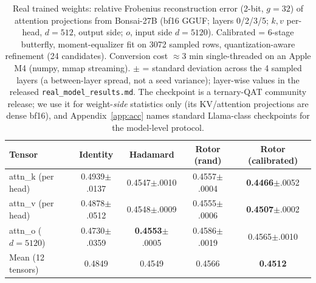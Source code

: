 \documentclass{article}
\begin{document}
\begin{table}[t]
\centering\small
\caption{Real trained weights: relative Frobenius reconstruction error
(2-bit, $g=32$) of attention projections from Bonsai-27B (bf16 GGUF; layers
0/2/3/5; $k,v$ per-head, $d{=}512$, output side; $o$, input side $d{=}5120$).
Calibrated = 6-stage butterfly, moment-equalizer fit on 3072 sampled rows,
quantization-aware refinement (24 candidates). Conversion cost $\approx$3 min
single-threaded on an Apple M4 (numpy, mmap streaming). $\pm$ = standard
deviation across the 4 sampled layers (a between-layer spread, not a seed
variance); layer-wise values in the released \texttt{real\_model\_results.md}.
The checkpoint is a ternary-QAT community release; we use it for weight-\emph{side}
statistics only (its KV/attention projections are dense bf16), and Appendix~\ref{app:acc}
names standard Llama-class checkpoints for the model-level protocol.}
\label{tab:real}
\begin{tabular}{lcccc}
\toprule
Tensor & Identity & Hadamard & Rotor (rand) & Rotor (calibrated) \\
\midrule
attn\_k (per head) & 0.4939{\scriptsize$\pm$.0137} & 0.4547{\scriptsize$\pm$.0010} & 0.4557{\scriptsize$\pm$.0004} & \textbf{0.4466}{\scriptsize$\pm$.0052} \\
attn\_v (per head) & 0.4878{\scriptsize$\pm$.0512} & 0.4548{\scriptsize$\pm$.0009} & 0.4555{\scriptsize$\pm$.0006} & \textbf{0.4507}{\scriptsize$\pm$.0002} \\
attn\_o ($d{=}5120$) & 0.4730{\scriptsize$\pm$.0359} & \textbf{0.4553}{\scriptsize$\pm$.0005} & 0.4586{\scriptsize$\pm$.0019} & 0.4565{\scriptsize$\pm$.0010} \\
\midrule
Mean (12 tensors) & 0.4849 & 0.4549 & 0.4566 & \textbf{0.4512} \\
\bottomrule
\end{tabular}
\end{table}
\end{document}
